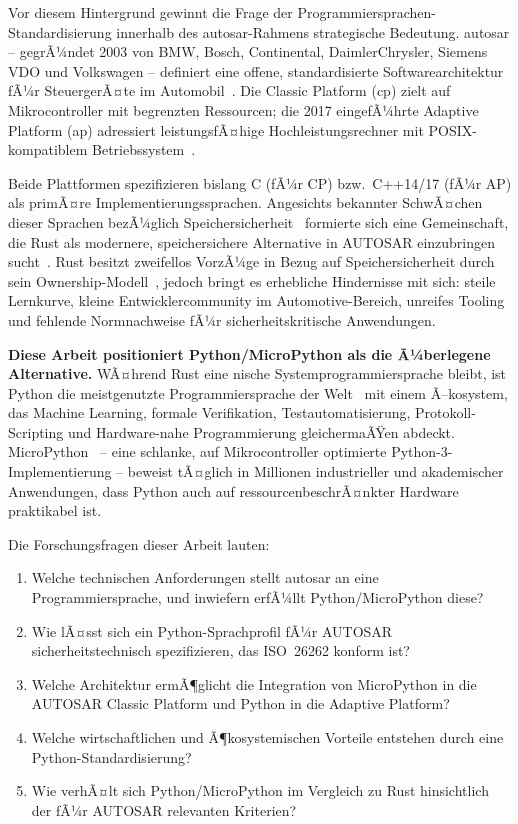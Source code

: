 ﻿\documentclass[12pt,a4paper,twoside]{article}
\begin{document}
Vor diesem Hintergrund gewinnt die Frage der Programmiersprachen-Standardisierung
innerhalb des \gls{autosar}-Rahmens strategische Bedeutung.
\gls{autosar} -- gegrÃ¼ndet 2003 von BMW, Bosch, Continental, DaimlerChrysler,
Siemens VDO und Volkswagen -- definiert eine offene, standardisierte
Softwarearchitektur fÃ¼r SteuergerÃ¤te im Automobil~\cite{autosar_overview2017}.
Die Classic Platform (\gls{cp}) zielt auf Mikrocontroller mit begrenzten
Ressourcen; die 2017 eingefÃ¼hrte Adaptive Platform (\gls{ap}) adressiert
leistungsfÃ¤hige Hochleistungsrechner mit POSIX-kompatiblem Betriebssystem~\cite{autosar_ap_explained2019}.

Beide Plattformen spezifizieren bislang C (fÃ¼r CP) bzw.\ C++14/17 (fÃ¼r AP)
als primÃ¤re Implementierungssprachen.
Angesichts bekannter SchwÃ¤chen dieser Sprachen bezÃ¼glich
Speichersicherheit~\cite{memory_safety_nsa2022} formierte sich eine Gemeinschaft,
die Rust als modernere, speichersichere Alternative in AUTOSAR einzubringen
sucht~\cite{autosar_rust_wp2023, autosar_wg_rustsafety}.
Rust besitzt zweifellos VorzÃ¼ge in Bezug auf Speichersicherheit durch sein
Ownership-Modell~\cite{rust_book2022}, jedoch bringt es erhebliche Hindernisse mit sich:
steile Lernkurve, kleine Entwicklercommunity im Automotive-Bereich,
unreifes Tooling und fehlende Normnachweise fÃ¼r sicherheitskritische Anwendungen.

\textbf{Diese Arbeit positioniert Python/MicroPython als die Ã¼berlegene Alternative.}
WÃ¤hrend Rust eine nische Systemprogrammiersprache bleibt, ist Python die
meistgenutzte Programmiersprache der Welt~\cite{tiobe2025, stackoverflow_survey2024}
mit einem Ã–kosystem, das Machine Learning, formale Verifikation,
Testautomatisierung, Protokoll-Scripting und Hardware-nahe Programmierung
gleichermaÃŸen abdeckt.
MicroPython~\cite{micropython_main, george2014micropython} -- eine schlanke,
auf Mikrocontroller optimierte Python-3-Implementierung -- beweist tÃ¤glich
in Millionen industrieller und akademischer Anwendungen, dass Python
auch auf ressourcenbeschrÃ¤nkter Hardware praktikabel ist.

Die Forschungsfragen dieser Arbeit lauten:
\begin{enumerate}
  \item Welche technischen Anforderungen stellt \gls{autosar} an eine Programmiersprache,
        und inwiefern erfÃ¼llt Python/MicroPython diese?
  \item Wie lÃ¤sst sich ein Python-Sprachprofil fÃ¼r AUTOSAR sicherheitstechnisch
        spezifizieren, das ISO~26262 konform ist?
  \item Welche Architektur ermÃ¶glicht die Integration von MicroPython in die
        AUTOSAR Classic Platform und Python in die Adaptive Platform?
  \item Welche wirtschaftlichen und Ã¶kosystemischen Vorteile entstehen durch
        eine Python-Standardisierung?
  \item Wie verhÃ¤lt sich Python/MicroPython im Vergleich zu Rust hinsichtlich
        der fÃ¼r AUTOSAR relevanten Kriterien?
\end{enumerate}
\end{document}
